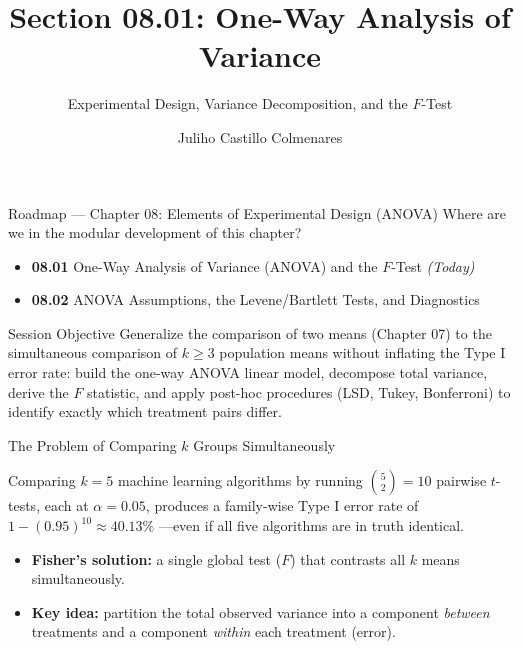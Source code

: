 \documentclass[10pt, aspectratio=169]{beamer}
\title[One-Way ANOVA]{Section 08.01: One-Way Analysis of Variance}
\subtitle{Experimental Design, Variance Decomposition, and the $F$-Test}
\author[J. Castillo Colmenares]{Juliho Castillo Colmenares}
\institute{Tecnológico de Monterrey}
\date{\vspace{-1.5cm}}
\begin{document}
\begin{frame}[plain]
  \titlepage
\end{frame}

\begin{frame}{Roadmap --- Chapter 08: Elements of Experimental Design (ANOVA)}
  \footnotesize
  Where are we in the modular development of this chapter? \pause
  \begin{itemize}\itemsep=0.08em
    \item \textbf{08.01} One-Way Analysis of Variance (ANOVA) and the $F$-Test \emph{(Today)} \pause
    \item \textbf{08.02} ANOVA Assumptions, the Levene/Bartlett Tests, and Diagnostics
  \end{itemize}
  \vspace{-0.05cm}
  \begin{block}{Session Objective}
    Generalize the comparison of two means (Chapter 07) to the simultaneous comparison of $k \geq 3$ population means without inflating the Type I error rate: build the one-way ANOVA linear model, decompose total variance, derive the $F$ statistic, and apply post-hoc procedures (LSD, Tukey, Bonferroni) to identify exactly which treatment pairs differ.
  \end{block}
\end{frame}

\begin{frame}{The Problem of Comparing $k$ Groups Simultaneously}
  \footnotesize
  \begin{motivacion}
    Comparing $k=5$ machine learning algorithms by running $\binom{5}{2}=10$ pairwise $t$-tests, each at $\alpha=0.05$, produces a family-wise Type I error rate of $1-(0.95)^{10}\approx 40.13\%$ ---even if all five algorithms are in truth identical.
  \end{motivacion}

  \vspace{0.15cm}
  \pause
  \begin{itemize}\itemsep=0.1cm
    \item \textbf{Fisher's solution:} a single global test ($F$) that contrasts all $k$ means simultaneously. \pause
    \item \textbf{Key idea:} partition the total observed variance into a component \emph{between} treatments and a component \emph{within} each treatment (error).
  \end{itemize}
\end{frame}
\end{document}
